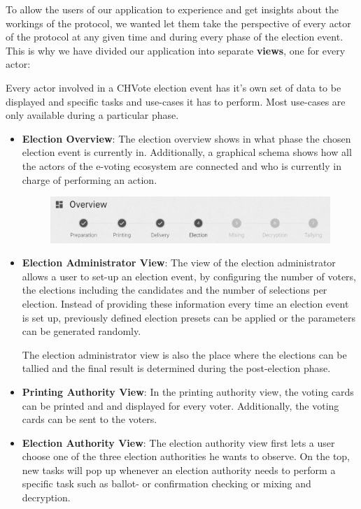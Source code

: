 To allow the users of our application to experience and get insights about the workings of the protocol, we wanted let them take the perspective of every actor of the protocol at any given time and during every phase of the election event. This is why we have divided our application into separate \textbf{views}, one for every actor:

Every actor involved in a CHVote election event has it's own set of data to be displayed and specific tasks and use-cases it has to perform. Most use-cases are only available during a particular phase.

\begin{itemize}
	\item \textbf{Election Overview}: The election overview shows in what phase the chosen election event is currently in. Additionally, a graphical schema shows how all the actors of the e-voting ecosystem are connected and who is currently in charge of performing an action.
\begin{figure}
\begin{center}
\includegraphics[scale=0.50]{assets/screenshots/overview.PNG}
\label{Election Overview}%
\end{center}
\end{figure}

	\item \textbf{Election Administrator View}: The view of the election administrator allows a user to set-up an election event, by configuring the number of voters, the elections including the candidates and the number of selections per election. Instead of providing these information every time an election event is set up, previously defined election presets can be applied or the parameters can be generated randomly.
	
The election administrator view is also the place where the elections can be tallied and the final result is determined during the post-election phase.
	\item \textbf{Printing Authority View}: In the printing authority view, the voting cards can be printed and and displayed for every voter. Additionally, the voting cards can be sent to the voters.
	\item \textbf{Election Authority View}: The election authority view first lets a user choose one of the three election authorities he wants to observe. On the top, new tasks will pop up whenever an election authority needs to perform a specific task such as ballot- or confirmation checking or mixing and decryption.
	

\end{itemize}
